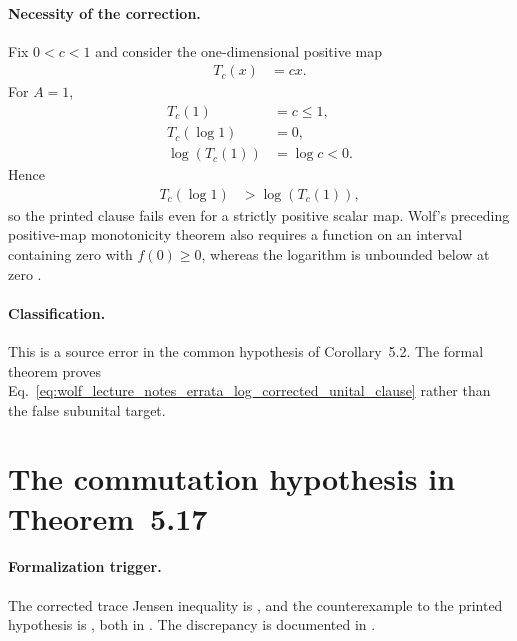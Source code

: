 \documentclass{article}
\begin{document}
\paragraph{Necessity of the correction.}
Fix $0<c<1$ and consider the one-dimensional positive map
\begin{align}
    T_c(x)
        &=cx.
    \label{eq:wolf_lecture_notes_errata_log_scalar_map}
\end{align}
For $A=1$,
\begin{align}
    T_c(1)
        &=c\leq1,
    \label{eq:wolf_lecture_notes_errata_log_scalar_subunital}\\
    T_c(\log1)
        &=0,
    \label{eq:wolf_lecture_notes_errata_log_scalar_left_side}\\
    \log(T_c(1))
        &=\log c<0.
    \label{eq:wolf_lecture_notes_errata_log_scalar_right_side}
\end{align}
Hence
\begin{align}
    T_c(\log1)
        &>\log(T_c(1)),
    \label{eq:wolf_lecture_notes_errata_log_scalar_contradiction}
\end{align}
so the printed clause fails even for a strictly positive scalar map. Wolf's
preceding positive-map monotonicity theorem also requires a function on an
interval containing zero with $f(0)\geq0$, whereas the logarithm is unbounded
below at zero \cite{Wolf2012Quantum}.

\paragraph{Classification.}
This is a source error in the common hypothesis of Corollary~5.2. The formal
theorem proves
Eq.~\ref{eq:wolf_lecture_notes_errata_log_corrected_unital_clause} rather than
the false subunital target.

\section{The commutation hypothesis in Theorem~5.17}
\label{sec:thm517-commutation}

\paragraph{Formalization trigger.}
The corrected trace Jensen inequality is
, and the
counterexample to the printed hypothesis is
, both in
. The discrepancy is documented
in .
\end{document}

